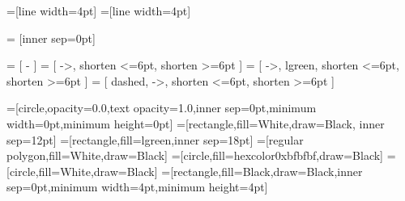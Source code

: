\usepackage{tikz}
\usetikzlibrary{arrows,backgrounds,shapes}

\usepackage{pgfplots}
\pgfplotsset{compat=newest}
\pgfplotsset{plot coordinates/math parser=false}



=[line width=4pt]
=[line width=4pt]

\tikzset{>=latex}
   = [inner sep=0pt]

  = [ - ]
  = [ ->, shorten <=6pt, shorten >=6pt ]
  = [ ->, lgreen, shorten <=6pt, shorten
>=6pt ]
 = [ dashed, ->, shorten <=6pt, shorten >=6pt ]

=[circle,opacity=0.0,text opacity=1.0,inner sep=0pt,minimum
width=0pt,minimum height=0pt]
=[rectangle,fill=White,draw=Black, inner sep=12pt]
=[rectangle,fill=lgreen,inner sep=18pt]
=[regular polygon,fill=White,draw=Black]
=[circle,fill=hexcolor0xbfbfbf,draw=Black]
=[circle,fill=White,draw=Black]
=[rectangle,fill=Black,draw=Black,inner sep=0pt,minimum width=4pt,minimum height=4pt]
